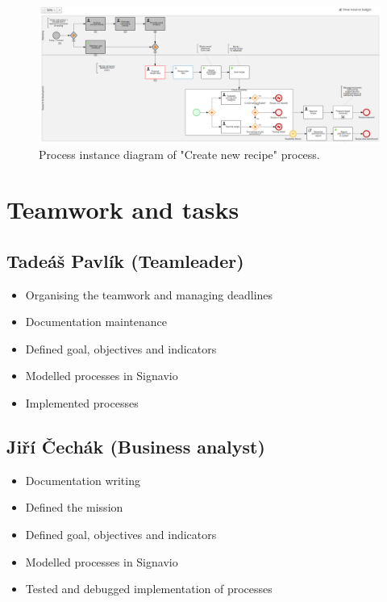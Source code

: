 \documentclass[11pt,a4paper]{article}
\begin{document}
\begin{figure}[H]
    \centering
    \includegraphics[width=\textwidth]{testing4.png}
    \caption{Process instance diagram of "Create new recipe" process.}
\end{figure}

\newpage


\section{Teamwork and tasks}

\subsection{Tadeáš Pavlík (Teamleader)}

\begin{itemize}
    \item Organising the teamwork and managing deadlines
    \item Documentation maintenance
    \item Defined goal, objectives and indicators
    \item Modelled processes in Signavio
    \item Implemented processes
\end{itemize}

\subsection{Jiří Čechák (Business analyst)}

\begin{itemize}
    \item Documentation writing
    \item Defined the mission
    \item Defined goal, objectives and indicators
    \item Modelled processes in Signavio
    \item Tested and debugged implementation of processes
\end{itemize}
\end{document}
